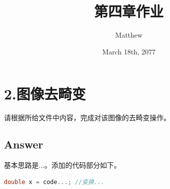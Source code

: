 \documentclass[
	12pt, %
]{fphw} %
\title{第四章作业} %
\author{Matthew} %
\date{March 18th, 2077} %
\institute{个人作业 \\ 视觉SLAM} %
\begin{document}
\maketitle %


\section*{2.图像去畸变}

\begin{problem}
	请根据所给文件中内容，完成对该图像的去畸变操作。
\end{problem}

\subsection*{Answer}

基本思路是...。添加的代码部分如下。
\begin{lstlisting}[language=C++, caption=题2所添代码]
	double x = code...;	//变换...	
\end{lstlisting}
\end{document}
